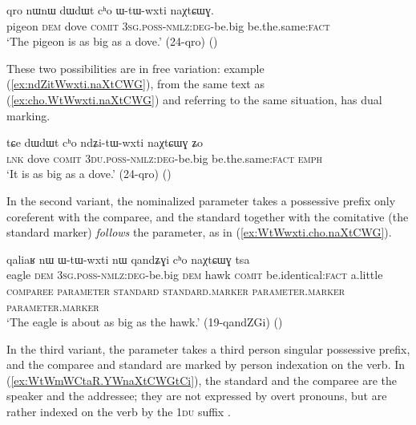 \begin{exe} %
\ex \label{ex:cho.WtWwxti.naXtCWG}
\gll  qro nɯnɯ dɯdɯt cʰo ɯ-tɯ-wxti naχtɕɯɣ. \\
pigeon \textsc{dem} dove \textsc{comit} \textsc{3sg}.\textsc{poss}-\textsc{nmlz}:\textsc{deg}-be.big be.the.same:\textsc{fact} \\
\glt `The pigeon is as big as a dove.' (24-qro)
()
\end{exe}

These two possibilities are in free variation: example (\ref{ex:ndZitWwxti.naXtCWG}), from the same text as (\ref{ex:cho.WtWwxti.naXtCWG}) and referring to the same situation, has dual marking.

\begin{exe}
\ex \label{ex:ndZitWwxti.naXtCWG}
\gll tɕe  dɯdɯt cʰo ndʑi-tɯ-wxti naχtɕɯɣ ʑo \\
\textsc{lnk} dove \textsc{comit} \textsc{3du}.\textsc{poss}-\textsc{nmlz}:\textsc{deg}-be.big be.the.same:\textsc{fact} \textsc{emph} \\
\glt `It is as big as a dove.' (24-qro)
()
\end{exe}

In the second variant,  the nominalized parameter takes a possessive prefix only coreferent with the comparee, and the standard together with the comitative (the standard marker) \textit{follows} the parameter, as in (\ref{ex:WtWwxti.cho.naXtCWG}).

\begin{exe}
\ex \label{ex:WtWwxti.cho.naXtCWG}
\glll qaliaʁ nɯ ɯ-tɯ-wxti nɯ qandʑɣi cʰo naχtɕɯɣ tsa 	\\
eagle \textsc{dem} \textsc{3sg}.\textsc{poss}-\textsc{nmlz}:\textsc{deg}-be.big \textsc{dem} hawk \textsc{comit} be.identical:\textsc{fact} a.little  \\
{\textsc{comparee}} { } \textsc{parameter} { } {\textsc{standard}} \textsc{standard}.\textsc{marker} \textsc{parameter}.\textsc{marker}  \textsc{parameter}.\textsc{marker} \\
\glt `The eagle is about as big as the hawk.' (19-qandZGi)
()
\end{exe}

In the third variant, the parameter takes a third person singular possessive prefix, and the comparee and standard are marked by person indexation on the verb. In (\ref{ex:WtWmWCtaR.YWnaXtCWGtCi}), the standard and the comparee are the speaker and the addressee; they are not expressed by overt pronouns, but are rather indexed on the verb by the \textsc{1du} suffix .

